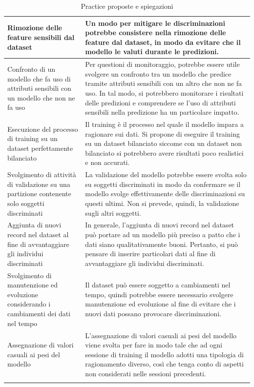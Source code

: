 \begin{longtable}{| p{} | p{} |}
    \\ \hline
    \rowcolor{Gray!30}
    Rimozione delle feature sensibili dal dataset
    &
    Un modo per mitigare le discriminazioni potrebbe consistere nella rimozione delle feature dal dataset, in modo da evitare che il modello le valuti durante le predizioni.
     \\ \hline
    Confronto di un modello che fa uso di attributi sensibili con un modello che non ne fa uso
    &
    Per questioni di monitoraggio, potrebbe essere utile svolgere un confronto tra un modello che predice tramite attributi sensibili con un altro che non ne fa uso. In tal modo, si potrebbero monitorare i risultati delle predizioni e comprendere se l'uso di attributi sensibili nella predizione ha un particolare impatto.
    \\ \hline
    \rowcolor{Gray!30}
    Esecuzione del processo di training su un dataset perfettamente bilanciato
    &
    Il training è il processo nel quale il modello impara a ragionare sui dati. Si propone di eseguire il training su un dataset bilanciato siccome con un dataset non bilanciato si potrebbero avere risultati poco realistici e non accurati.
     \\ \hline
    Svolgimento di attività di validazione su una partizione contenente solo soggetti discriminati
    &
    La validazione del modello potrebbe essere svolta solo su soggetti discriminati in modo da confermare se il modello svolge effettivamente delle discriminazioni su questi ultimi. Non si prevede, quindi, la validazione sugli altri soggetti.
    \\ \hline
    \rowcolor{Gray!30}
    Aggiunta di nuovi record nel dataset al fine di avvantaggiare gli individui discriminati
    &
    In generale, l'aggiunta di nuovi record nel dataset può portare ad un modello più preciso a patto che i dati siano qualitativamente buoni. Pertanto, si può pensare di inserire particolari dati al fine di avvantaggiare gli individui discriminati.
    \\ \hline
    Svolgimento di manutenzione ed evoluzione considerando i cambiamenti dei dati nel tempo
    &
    Il dataset può essere soggetto a cambiamenti nel tempo, quindi potrebbe essere necessario svolgere manutenzione ed evoluzione al fine di evitare che i nuovi dati possano provocare discriminazioni.
    \\ \hline
    \rowcolor{Gray!30}
    Assegnazione di valori casuali ai pesi del modello
    &
    L'assegnazione di valori casuali ai pesi del modello viene svolta per fare in modo tale che ad ogni sessione di training il modello adotti una tipologia di ragionamento diverso, così che tenga conto di aspetti non considerati nelle sessioni precedenti.
     \\ \hline
    \caption{Practice proposte e spiegazioni} %
    \label{tab:myfirstlongtable}
\end{longtable}

